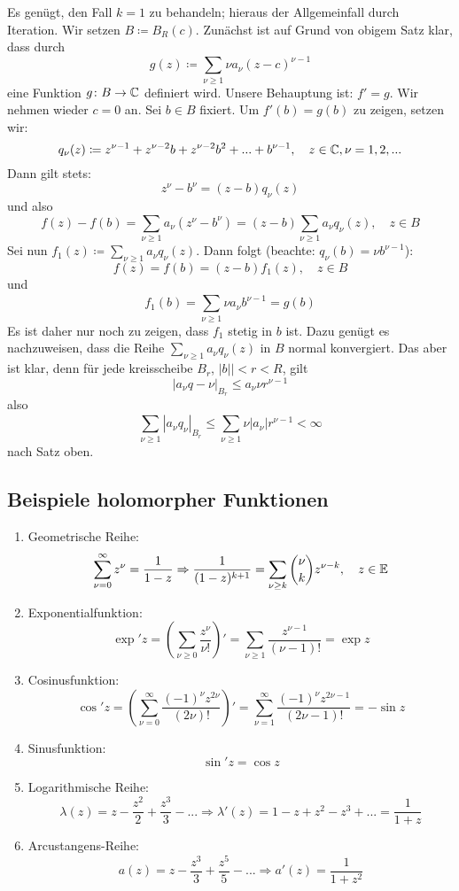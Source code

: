 \begin{beweis}
	Es gen\"ugt, den Fall $ k=1 $ zu behandeln; hieraus der Allgemeinfall durch Iteration. Wir setzen $ B\coloneqq B_R(c) $. Zun\"achst ist auf Grund von obigem Satz klar, dass durch
	\[ g(z)\coloneqq\sum_{\nu\geq 1} \nu a_\nu(z-c)^{\nu-1} \]
	eine Funktion $ g\colon B\rightarrow\mathbb{C} $ definiert wird. Unsere Behauptung ist: $ f'=g $. Wir nehmen wieder $ c=0 $ an. Sei $ b\in B $ fixiert. Um $ f'(b)=g(b) $ zu zeigen, setzen wir: \[ q_\nu(z)\coloneqq z^{\nu-1}+z^{\nu-2}b+z^{\nu-2}b^2+...+b^{\nu-1},\quad z\in\mathbb{C}, \nu=1,2,... \]
	Dann gilt stets:
	\[ z^\nu-b^\nu=(z-b)q_\nu(z) \]
	und also \[ f(z)-f(b)=\sum_{\nu\geq 1} a_\nu(z^\nu-b^\nu)=(z-b)\sum_{\nu\geq 1} a_\nu q_\nu(z),\quad z\in B \]
	Sei nun $ f_1(z)\coloneqq\sum_{\nu\geq 1}^{} a_\nu q_\nu(z) $. Dann folgt (beachte: $ q_\nu(b)=\nu b^{\nu-1} $):
	\[ f(z)=f(b)=(z-b)f_1(z),\quad z\in B \] und
	\[ f_1(b)=\sum_{\nu\geq 1}^{} \nu a_\nu b^{\nu-1}=g(b) \]
	Es ist daher nur noch zu zeigen, dass $ f_1 $ stetig in $ b $ ist. Dazu gen\"ugt es nachzuweisen, dass die Reihe $ \sum_{\nu\geq 1} a_\nu q_\nu(z) $ in $ B $ normal konvergiert. Das aber ist klar, denn f\"ur jede kreisscheibe $ B_r $, $ |b||<r<R $, gilt
	\[ |a_\nu q-\nu|_{B_r}\leq a_\nu\nu r^{\nu-1} \]
	also
	\[ \sum_{\nu\geq 1}^{}|a_\nu q_\nu|_{B_r}\leq\sum_{\nu\geq 1}^{} \nu|a_\nu|r^{\nu-1}<\infty \]
	nach Satz oben.
\end{beweis}
\subsection{Beispiele holomorpher Funktionen}
\begin{enumerate}
	\item Geometrische Reihe:
	\[ \sum_{\nu=0}^\infty z^\nu=\frac{1}{1-z}\Rightarrow\frac{1}{(1-z)^{k+1}}=\sum_{\nu\geq k}^{}\binom{\nu}{k}z^{\nu-k},\quad z\in\mathbb{E}  \]
	\item Exponentialfunktion:
	\[ \exp' z=\left(\sum_{\nu\geq 0}^{}\frac{z^\nu}{\nu!}\right)'=\sum_{\nu\geq 1}^{}\frac{z^{\nu-1}}{(\nu-1)!}=\exp z \]
	\item Cosinusfunktion:
	\[ \cos' z=\left(\sum_{\nu=0}^{\infty}\frac{(-1)^\nu z^{2\nu}}{(2\nu)!}\right)'=\sum_{\nu=1}^{\infty}\frac{(-1)^\nu z^{2\nu-1}}{(2\nu-1)!}=-\sin z \]
	\item Sinusfunktion:
	\[ \sin' z=\cos z \]
	\item Logarithmische Reihe:
	\[ \lambda(z)=z-\frac{z^2}{2}+\frac{z^3}{3}-...\Rightarrow\lambda'(z)=1-z+z^2-z^3+...=\frac{1}{1+z} \]
	\item Arcustangens-Reihe:
	\[ a(z)=z-\frac{z^3}{3}+\frac{z^5}{5}-...\Rightarrow a'(z)=\frac{1}{1+z^2} \]
\end{enumerate}
